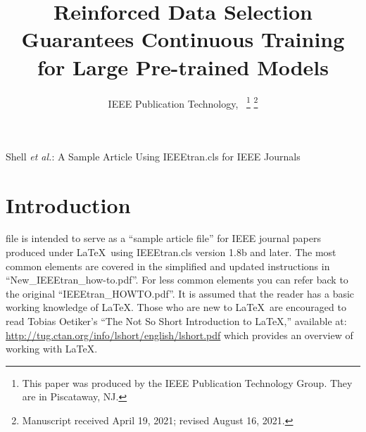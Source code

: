 \documentclass[lettersize,journal]{IEEEtran}
\begin{document}
\title{Reinforced Data Selection Guarantees Continuous Training for Large Pre-trained Models}


\author{IEEE Publication Technology,~
\thanks{This paper was produced by the IEEE Publication Technology Group. They are in Piscataway, NJ.}%
\thanks{Manuscript received April 19, 2021; revised August 16, 2021.}}

%
{Shell \MakeLowercase{\textit{et al.}}: A Sample Article Using IEEEtran.cls for IEEE Journals}


\maketitle

\begin{abstract}
% 
\end{abstract}

\begin{IEEEkeywords}
\end{IEEEkeywords}

\section{Introduction}
 file is intended to serve as a ``sample article file''
for IEEE journal papers produced under \LaTeX\ using
IEEEtran.cls version 1.8b and later. The most common elements are covered in the simplified and updated instructions in ``New\_IEEEtran\_how-to.pdf''. For less common elements you can refer back to the original ``IEEEtran\_HOWTO.pdf''. It is assumed that the reader has a basic working knowledge of \LaTeX. Those who are new to \LaTeX \ are encouraged to read Tobias Oetiker's ``The Not So Short Introduction to \LaTeX ,'' available at: \url{http://tug.ctan.org/info/lshort/english/lshort.pdf} which provides an overview of working with \LaTeX.
\end{document}
